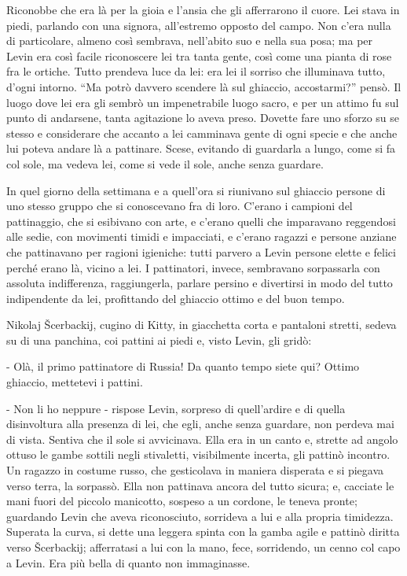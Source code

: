 Riconobbe che era là per la gioia e l'ansia che gli afferrarono il cuore. Lei stava in piedi, parlando con una signora, all'estremo opposto del campo. Non c'era nulla di particolare, almeno così sembrava, nell'abito suo e nella sua posa; ma per Levin era così facile riconoscere lei tra tanta gente, così come una pianta di rose fra le ortiche. Tutto prendeva luce da lei: era lei il sorriso che illuminava tutto, d'ogni intorno. ``Ma potrò davvero scendere là sul ghiaccio, accostarmi?'' pensò. Il luogo dove lei era gli sembrò un impenetrabile luogo sacro, e per un attimo fu sul punto di andarsene, tanta agitazione lo aveva preso. Dovette fare uno sforzo su se stesso e considerare che accanto a lei camminava gente di ogni specie e che anche lui poteva andare là a pattinare. Scese, evitando di guardarla a lungo, come si fa col sole, ma vedeva lei, come si vede il sole, anche senza guardare. 

In quel giorno della settimana e a quell'ora si riunivano sul ghiaccio persone di uno stesso gruppo che si conoscevano fra di loro. C'erano i campioni del pattinaggio, che si esibivano con arte, e c'erano quelli che imparavano reggendosi alle sedie, con movimenti timidi e impacciati, e c'erano ragazzi e persone anziane che pattinavano per ragioni igieniche: tutti parvero a Levin persone elette e felici perché erano là, vicino a lei. I pattinatori, invece, sembravano sorpassarla con assoluta indifferenza, raggiungerla, parlare persino e divertirsi in modo del tutto indipendente da lei, profittando del ghiaccio ottimo e del buon tempo. 

Nikolaj Šcerbackij, cugino di Kitty, in giacchetta corta e pantaloni stretti, sedeva su di una panchina, coi pattini ai piedi e, visto Levin, gli gridò: 

- Olà, il primo pattinatore di Russia! Da quanto tempo siete qui? Ottimo ghiaccio, mettetevi i pattini. 

- Non li ho neppure - rispose Levin, sorpreso di quell'ardire e di quella disinvoltura alla presenza di lei, che egli, anche senza guardare, non perdeva mai di vista. Sentiva che il sole si avvicinava. Ella era in un canto e, strette ad angolo ottuso le gambe sottili negli stivaletti, visibilmente incerta, gli pattinò incontro. Un ragazzo in costume russo, che gesticolava in maniera disperata e si piegava verso terra, la sorpassò. Ella non pattinava ancora del tutto sicura; e, cacciate le mani fuori del piccolo manicotto, sospeso a un cordone, le teneva pronte; guardando Levin che aveva riconosciuto, sorrideva a lui e alla propria timidezza. Superata la curva, si dette una leggera spinta con la gamba agile e pattinò diritta verso Šcerbackij; afferratasi a lui con la mano, fece, sorridendo, un cenno col capo a Levin. Era più bella di quanto non immaginasse. 

